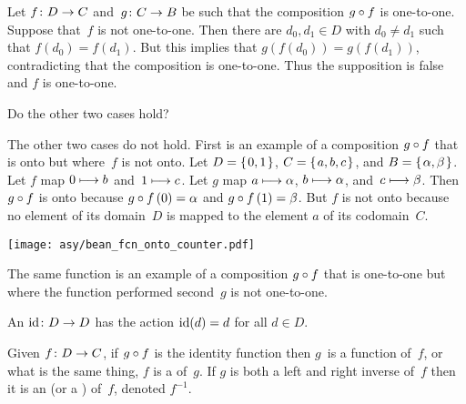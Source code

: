 \documentclass{ibl}  %
\begin{document}
\begin{problem}
\begin{exes}
\begin{exercise}
\end{exercise}
\begin{answer}
  Let $\mbox{$f\colon D\to C$}$ and~$\mbox{$g\colon C\to B$}$ be such that 
  the composition $g\mathbin{\circ} f$ is one-to-one.
  Suppose that~$f$ is not one-to-one.
  Then there are $d_0,d_1\in D$ with $d_0\neq d_1$ such that $f(d_0)=f(d_1)$.
  But this implies that $g(f(d_0))=g(f(d_1))$, contradicting that 
  the composition is one-to-one.
  Thus the supposition is false and $f$ is one-to-one.  
\end{answer}
\begin{exercise} 
  Do the other two cases hold? 
\end{exercise}
\begin{answer}
  The other two cases do not hold.
  First is an example of a composition $g\mathbin{\circ} f$ that is onto
  but where~$f$ is not onto.   
  Let $D=\mbox{$\{\hspace{0.1em}0,1\hspace{0.1em}\}$}$, $C=\mbox{$\{\hspace{0.1em}a,b,c\hspace{0.1em}\}$}$, and $B=\mbox{$\{\hspace{0.1em}\alpha, \beta\hspace{0.1em}\}$}$.
  Let $f$ map $0\stackrel{}{\longmapsto} b$ and~$1\stackrel{}{\longmapsto} c$.
  Let $g$ map $a\stackrel{}{\longmapsto} \alpha$, $b\stackrel{}{\longmapsto}\alpha$, 
  and~$c\stackrel{}{\longmapsto} \beta$. 
  Then $g\mathbin{\circ} f$ is onto because $g\mathbin{\circ} f\,(0)=\alpha$ and
  $g\mathbin{\circ} f\,(1)=\beta$.
  But $f$ is not onto because no element of its domain~$D$ is mapped to the
  element $a$ of its codomain~$C$. 
  \begin{center}
    \texttt{[image: asy/bean\_fcn\_onto\_counter.pdf]}
  \end{center}
  The same function is an example of a composition $g\mathbin{\circ} f$ 
  that is one-to-one but where
  the function performed second~$g$ is not one-to-one.
\end{answer}
\end{exes}
\end{problem}

\begin{df}
An  $\mbox{$\operatorname{id}\colon D\to D$}$ has the action
$\operatorname{id}(d)=d$ for all $d\in D$.
\end{df}

\begin{df}
Given $\mbox{$f\colon D\to C$}$,
if $g\mathbin{\circ} f$ is the identity function then 
$g$~is a  function of~$f$, or what is the
same thing, $f$ is a  of~$g$.
If $g$ is both a left and right inverse of~$f$ then
it is an 
(or a ) of~$f$, denoted $f^{-1}$. 
\end{df}
\end{document}
